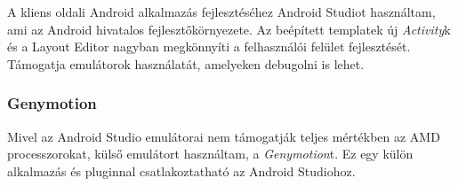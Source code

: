 A kliens oldali Android alkalmazás fejlesztéséhez Android Studiot használtam, ami az Android hivatalos fejlesztőkörnyezete. Az beépített templatek új \emph{Activity}k és a Layout Editor nagyban megkönnyíti a felhasználói felület fejlesztését. Támogatja emulátorok használatát, amelyeken debugolni is lehet.

\subsubsection{Genymotion}

Mivel az Android Studio emulátorai nem támogatják teljes mértékben az AMD processzorokat, külső emulátort használtam, a \emph{Genymotion}t. Ez egy külön alkalmazás és pluginnal csatlakoztatható az Android Studiohoz.

